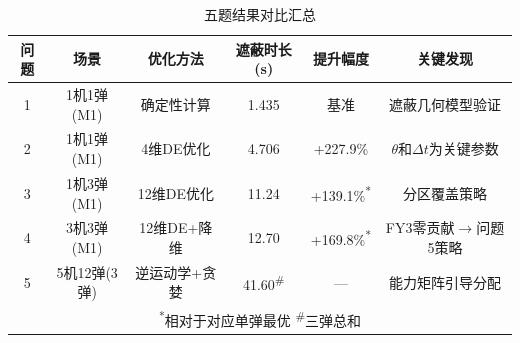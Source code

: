 \documentclass[12pt,a4paper]{ctexart}
\begin{document}
\begin{table}[H]
\centering
\caption{五题结果对比汇总}
\begin{tabular}{c|c|c|c|c|c}
\toprule
\textbf{问题} & \textbf{场景} & \textbf{优化方法} & \textbf{遮蔽时长(s)} & \textbf{提升幅度} & \textbf{关键发现} \\
\midrule
1 & 1机1弹(M1) & 确定性计算 & 1.435 & 基准 & 遮蔽几何模型验证 \\
2 & 1机1弹(M1) & 4维DE优化 & 4.706 & +227.9\% & $\theta$和$\Delta t$为关键参数 \\
3 & 1机3弹(M1) & 12维DE优化 & 11.24 & +139.1\%\textsuperscript{*} & 分区覆盖策略 \\
4 & 3机3弹(M1) & 12维DE+降维 & 12.70 & +169.8\%\textsuperscript{*} & FY3零贡献$\to$问题5策略 \\
5 & 5机12弹(3弹) & 逆运动学+贪婪 & 41.60\textsuperscript{\#} & — & 能力矩阵引导分配 \\
\bottomrule
\multicolumn{6}{c}{\textsuperscript{*}相对于对应单弹最优 \quad \textsuperscript{\#}三弹总和} \\
\end{tabular}
\end{table}
\end{document}
